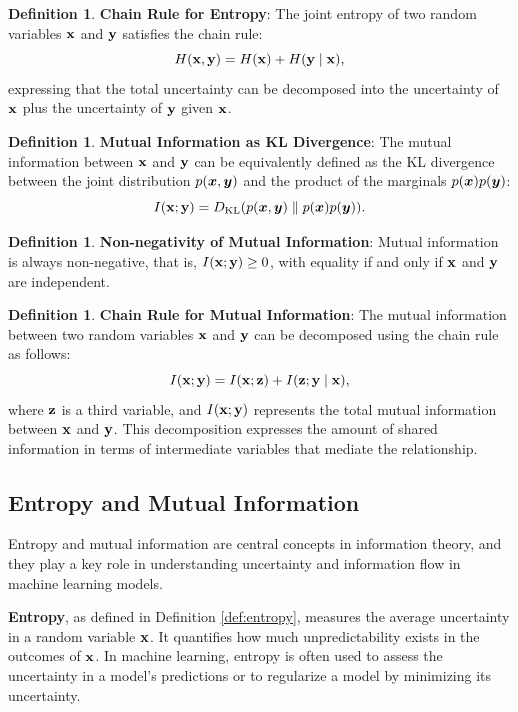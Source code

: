 \documentclass[11pt, oneside]{book}
\theoremstyle{plain}
\theoremstyle{definition}
\newtheorem{definition}[theorem]{Definition}
\theoremstyle{remark}
\begin{document}
\begin{definition}
\textbf{Chain Rule for Entropy}: The joint entropy of two random variables ${\mathbf{x}}$ and ${\mathbf{y}}$ satisfies the chain rule:
\[
H({\mathbf{x}}, {\mathbf{y}}) = H({\mathbf{x}}) + H({\mathbf{y}} \mid {\mathbf{x}}),
\]
expressing that the total uncertainty can be decomposed into the uncertainty of ${\mathbf{x}}$ plus the uncertainty of ${\mathbf{y}}$ given ${\mathbf{x}}$.
\label{def:chain_rule}
\end{definition}

\begin{definition}
\textbf{Mutual Information as KL Divergence}: The mutual information between ${\mathbf{x}}$ and ${\mathbf{y}}$ can be equivalently defined as the KL divergence between the joint distribution $p({\bm{x}}, {\bm{y}})$ and the product of the marginals $p({\bm{x}})p({\bm{y}})$:
\[
I({\mathbf{x}}; {\mathbf{y}}) = D_{\mathrm{KL}}(p({\bm{x}}, {\bm{y}}) \parallel p({\bm{x}})p({\bm{y}})).
\]
\label{def:mi_kl}
\end{definition}

\begin{definition}
\textbf{Non-negativity of Mutual Information}: Mutual information is always non-negative, that is, $I({\mathbf{x}}; {\mathbf{y}}) \geq 0$, with equality if and only if ${\mathbf{x}}$ and ${\mathbf{y}}$ are independent.
\label{def:nonneg_mi}
\end{definition}

\begin{definition}
\textbf{Chain Rule for Mutual Information}: The mutual information between two random variables ${\mathbf{x}}$ and ${\mathbf{y}}$ can be decomposed using the chain rule as follows:
\[
I({\mathbf{x}}; {\mathbf{y}}) = I({\mathbf{x}}; {\mathbf{z}}) + I({\mathbf{z}}; {\mathbf{y}} \mid {\mathbf{x}}),
\]
where ${\mathbf{z}}$ is a third variable, and $I({\mathbf{x}}; {\mathbf{y}})$ represents the total mutual information between ${\mathbf{x}}$ and ${\mathbf{y}}$. This decomposition expresses the amount of shared information in terms of intermediate variables that mediate the relationship.
\label{def:chain_rule_mi}
\end{definition}

\subsection{Entropy and Mutual Information}

Entropy and mutual information are central concepts in information theory, and they play a key role in understanding uncertainty and information flow in machine learning models. 

\textbf{Entropy}, as defined in Definition \ref{def:entropy}, measures the average uncertainty in a random variable ${\mathbf{x}}$. It quantifies how much unpredictability exists in the outcomes of ${\mathbf{x}}$. In machine learning, entropy is often used to assess the uncertainty in a model's predictions or to regularize a model by minimizing its uncertainty.
\end{document}
